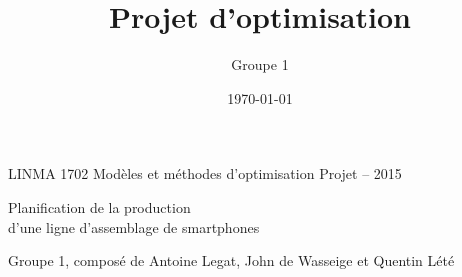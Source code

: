 \documentclass[11pt,oneside,a4paper]{article}
\title{Projet d'optimisation}
\author{Groupe 1}
\date{\today}
\begin{document}
LINMA 1702 Mod\`{e}les et m\'{e}thodes d'optimisation \hfill Projet -- 2015 
\begin{center} {\Large Planification de la production \\ d'une ligne d'assemblage de smartphones}

\bigskip

Groupe 1, composé de Antoine Legat, John de Wasseige et Quentin Lété
\end{center}



\newpage

\appendix

\end{document}
